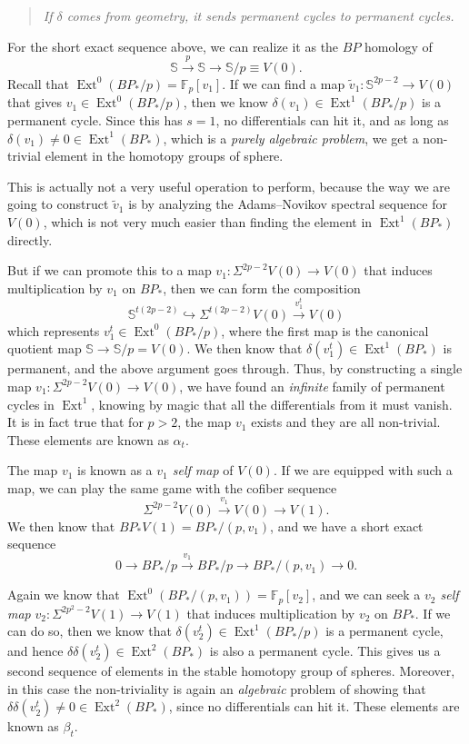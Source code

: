 \documentclass{shortart}
\theoremstyle{definition}
\newcommand\F{\mathbb{F}}
\newcommand\Sph{\mathbb{S}}
\DeclareMathOperator\Ext{Ext}
\begin{document}
\begin{quote}
  \emph{If $\delta$ comes from geometry, it sends permanent cycles to permanent cycles.}
\end{quote}

For the short exact sequence above, we can realize it as the $BP$ homology of 
\[
  \Sph \overset{p}{\longrightarrow} \Sph \longrightarrow \Sph/p \equiv V(0).
\]
Recall that $\Ext^0(BP_*/p) = \F_p[v_1]$. If we can find a map $\tilde{v}_1: \Sph^{2p - 2} \to V(0)$ that gives $v_1 \in \Ext^0(BP_*/p)$, then we know $\delta (v_1) \in \Ext^1(BP_*/p)$ is a permanent cycle. Since this has $s = 1$, no differentials can hit it, and as long as $\delta (v_1) \not= 0 \in \Ext^1(BP_*)$, which is a \emph{purely algebraic problem}, we get a non-trivial element in the homotopy groups of sphere.

This is actually not a very useful operation to perform, because the way we are going to construct $\tilde{v}_1$ is by analyzing the Adams--Novikov spectral sequence for $V(0)$, which is not very much easier than finding the element in $\Ext^1(BP_*)$ directly.

But if we can promote this to a map $v_1: \Sigma^{2p - 2} V(0) \to V(0)$ that induces multiplication by $v_1$ on $BP_*$, then we can form the composition
\[
  \Sph^{t (2p - 2)} \hookrightarrow \Sigma^{t(2p - 2)} V(0) \overset{v_1^t}{\longrightarrow} V(0)
\]
which represents $v_1^t \in  \Ext^0(BP_*/p)$, where the first map is the canonical quotient map $\Sph \to \Sph/p = V(0)$. We then know that $\delta(v_1^t) \in \Ext^1(BP_*)$ is permanent, and the above argument goes through. Thus, by constructing a single map $v_1: \Sigma^{2p - 2} V(0) \to V(0)$, we have found an \emph{infinite} family of permanent cycles in $\Ext^1$, knowing by magic that all the differentials from it must vanish. It is in fact true that for $p > 2$, the map $v_1$ exists and they are all non-trivial. These elements are known as $\alpha_t$.

The map $v_1$ is known as a \emph{$v_1$ self map} of $V(0)$. If we are equipped with such a map, we can play the same game with the cofiber sequence
\[
  \Sigma^{2p - 2} V(0) \overset{v_1}{\longrightarrow} V(0) \to V(1).
\]
We then know that $BP_* V(1) = BP_*/(p, v_1)$, and we have a short exact sequence
\[
  0 \longrightarrow BP_*/p \overset{v_1}{\longrightarrow} BP_*/p \longrightarrow BP_*/(p, v_1) \longrightarrow 0.
\]

Again we know that $\Ext^0(BP_*/(p, v_1)) = \F_p[v_2]$, and we can seek a \emph{$v_2$ self map} $v_2: \Sigma^{2p^2 - 2} V(1) \to V(1)$ that induces multiplication by $v_2$ on $BP_*$. If we can do so, then we know that $\delta (v_2^t) \in \Ext^1(BP_*/p)$ is a permanent cycle, and hence $\delta \delta (v_2^t) \in \Ext^2(BP_*)$ is also a permanent cycle. This gives us a second sequence of elements in the stable homotopy group of spheres. Moreover, in this case the non-triviality is again an \emph{algebraic} problem of showing that $\delta \delta (v_2^t) \not= 0 \in \Ext^2(BP_*)$, since no differentials can hit it. These elements are known as $\beta_t$.
\end{document}
